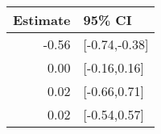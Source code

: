 \begin{tabular}{rl}
  \hline
Estimate & 95\% CI \\ 
  \hline
-0.56 & [-0.74,-0.38] \\ 
  0.00 & [-0.16,0.16] \\ 
  0.02 & [-0.66,0.71] \\ 
  0.02 & [-0.54,0.57] \\ 
   \hline
\end{tabular}

